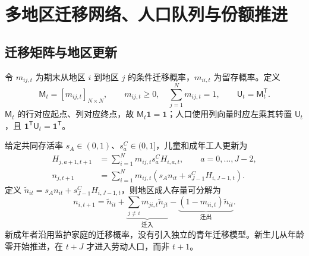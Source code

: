 \documentclass[UTF8,a4paper,zihao=-4,fontset=windows]{ctexart}
\numberwithin{equation}{section}
\newcommand{\ones}{\bm{1}}
\begin{document}
\section{多地区迁移网络、人口队列与份额推进}
\label{sec:lg-demography}

\subsection{迁移矩阵与地区更新}
令 $m_{ij,t}$ 为期末从地区 $i$ 到地区 $j$ 的条件迁移概率，$m_{ii,t}$ 为留存概率。定义
\begin{equation}
 \mathsf M_t=[m_{ij,t}]_{N\times N},\qquad
 m_{ij,t}\geq0,\quad\sum_{j=1}^Nm_{ij,t}=1,\qquad
 \mathsf U_t=\mathsf M_t^{\mathsf T}.
 \label{eq:lg-matrix-migration}
\end{equation}
$\mathsf M_t$ 的行对应起点、列对应终点，故 $\mathsf M_t\ones=\ones$；人口使用列向量时应左乘其转置 $\mathsf U_t$，且 $\ones^{\mathsf T}\mathsf U_t=\ones^{\mathsf T}$。

给定共同存活率 $s_A\in(0,1)$、$s^C_a\in(0,1]$，儿童和成年工人更新为
\begin{align}
 H_{j,a+1,t+1}&=\sum_{i=1}^Nm_{ij,t}s^C_aH_{i,a,t},
 \qquad a=0,\ldots,J-2,\label{eq:lg-child-transition}\\
 n_{j,t+1}&=\sum_{i=1}^Nm_{ij,t}
 \left(s_An_{it}+s^C_{J-1}H_{i,J-1,t}\right).
 \label{eq:lg-adult-transition}
\end{align}
定义 $\widetilde n_{it}=s_An_{it}+s^C_{J-1}H_{i,J-1,t}$，则地区成人存量可分解为
\begin{equation}
 n_{i,t+1}=\widetilde n_{it}
 +\underbrace{\sum_{j\neq i}m_{ji,t}\widetilde n_{jt}}_{\text{迁入}}
 -\underbrace{(1-m_{ii,t})\widetilde n_{it}}_{\text{迁出}}.
 \label{eq:lg-net-migration}
\end{equation}
新成年者沿用监护家庭的迁移概率，没有引入独立的青年迁移模型。新生儿从年龄零开始推进，在 $t+J$ 才进入劳动人口，而非 $t+1$。
\end{document}
